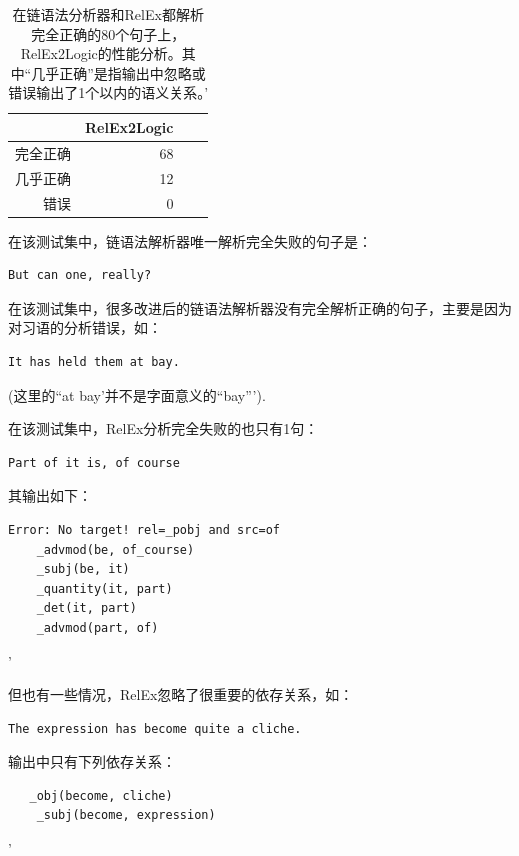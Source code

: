 \begin{table}
\center
\begin{tabular}{|r|r|r||c|}
\hline
 & RelEx2Logic\\
\hline
完全正确 & 68    \\
几乎正确 & 12     \\
错误 & 0     \\

\hline
\end{tabular}
\caption{在链语法分析器和RelEx都解析完全正确的80个句子上，RelEx2Logic的性能分析。其中“几乎正确”是指输出中忽略或错误输出了1个以内的语义关系。'}
\label{table:settings}
\end{table}

\FloatBarrier


在该测试集中，链语法解析器唯一解析完全失败的句子是：

\begin{verbatim}
But can one, really?
\end{verbatim}

\noindent 在该测试集中，很多改进后的链语法解析器没有完全解析正确的句子，主要是因为对习语的分析错误，如：

 \begin{verbatim}
It has held them at bay.
 \end{verbatim}

\noindent (这里的``at bay'并不是字面意义的“bay”').


在该测试集中，RelEx分析完全失败的也只有1句：

 \begin{verbatim}
Part of it is, of course
 \end{verbatim}
 
 \noindent 其输出如下：

 \begin{verbatim}
Error: No target! rel=_pobj and src=of
    _advmod(be, of_course)
    _subj(be, it)
    _quantity(it, part)
    _det(it, part)
    _advmod(part, of)
 \end{verbatim}'
 
\noindent  但也有一些情况，RelEx忽略了很重要的依存关系，如：

 \begin{verbatim}
The expression has become quite a cliche.
\end{verbatim}

输出中只有下列依存关系：

 \begin{verbatim}
   _obj(become, cliche)
    _subj(become, expression)
   \end{verbatim}'
     
